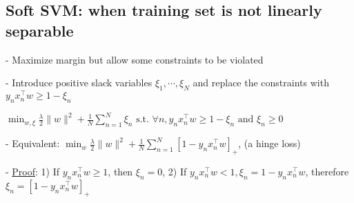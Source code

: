 




\subsection*{Soft SVM: when training set is not linearly separable}



- Maximize margin but allow some constraints to be violated

- Introduce positive slack variables $\xi_{1}, \cdots, \xi_{N}$ and replace the constraints with $y_{n} x_{n}^{\top} w \geq 1-\xi_{n}$ 

$\min _{w, \xi} \frac{\lambda}{2}\|w\|^{2}+\frac{1}{N} \sum_{n=1}^{N} \xi_{n} \text { s.t. } \forall n, y_{n} x_{n}^{\top} w \geq 1-\xi_{n} \text { and } \xi_{n} \geq 0
$

- Equivalent:
$
\min _{w} \frac{\lambda}{2}\|w\|^{2}+\frac{1}{N} \sum_{n=1}^{N}\left[1-y_{n} x_{n}^{\top} w\right]_{+}
$, 
(a hinge loss)



 
- \underline{Proof}:
1) If $y_{n} x_{n}^{\top} w \geq 1$, then $\xi_{n}=0$, 
2) If $y_{n} x_{n}^{\top} w<1, \xi_{n}=1-y_{n} x_{n}^{\top} w$,
therefore $\xi_{n}=\left[1-y_{n} x_{n}^{\top} w\right]_{+}$



